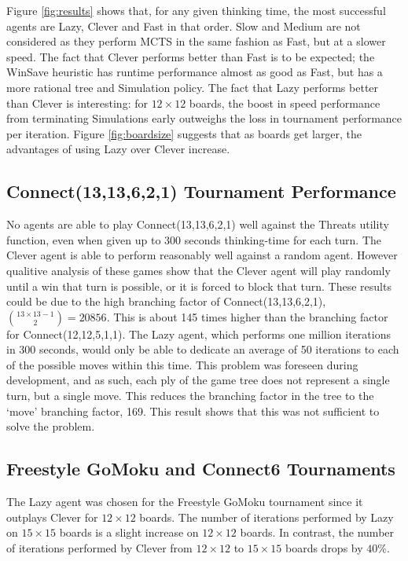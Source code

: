 Figure \ref{fig:results} shows that, for any given thinking time, the most successful agents are {Lazy}, {Clever} and {Fast} in that order. {Slow} and {Medium} are not considered as they perform {MCTS} in the same fashion as {Fast}, but at a slower speed. The fact that {Clever} performs better than {Fast} is to be expected; the {WinSave} heuristic has runtime performance almost as good as {Fast}, but has a more rational tree and Simulation policy. The fact that {Lazy} performs better than {Clever} is interesting: for $12 \times 12$ boards, the boost in speed performance from terminating Simulations early outweighs the loss in tournament performance per iteration. Figure \ref{fig:boardsize} suggests that as boards get larger, the advantages of using {Lazy} over {Clever} increase.



\subsection{{Connect}(13,13,6,2,1) Tournament Performance}
No agents are able to play {Connect}(13,13,6,2,1) well against the {Threats} utility function, even when given up to 300 seconds thinking-time for each turn. The {Clever} agent is able to perform reasonably well against a random agent. However qualitive analysis of these games show that the {Clever} agent will play randomly until a win that turn is possible, or it is forced to block that turn. These results could be due to the high branching factor of {Connect}(13,13,6,2,1), $\binom{13 \times 13 -1}{2} = 20856$. This is about 145 times higher than the branching factor for {Connect}(12,12,5,1,1). The {Lazy} agent, which performs one million iterations in 300 seconds, would only be able to dedicate an average of 50 iterations to each of the possible moves within this time. This problem was foreseen during development, and as such, each ply of the game tree does not represent a single turn, but a single move. This reduces the branching factor in the tree to the `move' branching factor, 169. This result shows that this was not sufficient to solve the problem.

\subsection{{Freestyle GoMoku} and {Connect6} Tournaments}
The {Lazy} agent was chosen for the {Freestyle GoMoku} tournament since it outplays {Clever} for $12 \times 12$ boards. The number of iterations performed by {Lazy} on $15 \times 15$ boards is a slight increase on $12 \times 12$ boards. In contrast, the number of iterations performed by {Clever} from $12 \times 12$ to $15 \times 15$ boards drops by $40\%$. 

